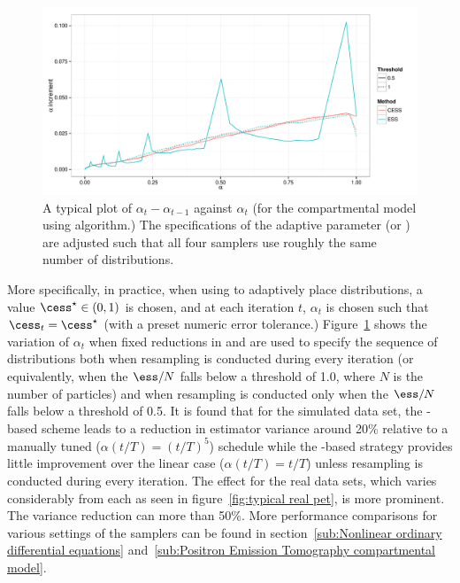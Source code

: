 \begin{figure}[t]
  \includegraphics[width=\linewidth]{fig/Adaptive_Dist}
  \caption{A typical plot of $\alpha_t - \alpha_{t-1}$ against $\alpha_t$ (for
    the \pet compartmental model using \smc[2] algorithm.) The specifications of
    the adaptive parameter (\ess or \cess) are adjusted such that all four
    samplers use roughly the same number of distributions.}
  \label{fig:adaptive_alpha}
\end{figure}

More specifically, in practice, when using \cess to adaptively place
distributions, a value $\cess^\star \in (0, 1)$ is chosen, and at each
iteration $t$, $\alpha_t$ is chosen such that $\cess_t = \cess^\star$ (with a
preset numeric error tolerance.) Figure~\ref{fig:adaptive_alpha} shows the
variation of $\alpha_t$ when fixed reductions in \ess and \cess are used to
specify the sequence of distributions both when resampling is conducted during
every iteration (or equivalently, when the $\ess/N$ falls below a threshold of
1.0, where $N$ is the number of particles) and when resampling is conducted
only when the $\ess/N$ falls below a threshold of 0.5. It is found that for
the simulated \pet data set, the \cess-based scheme leads to a reduction in
estimator variance around 20\% relative to a manually tuned ($\alpha(t/T) =
(t/T)^5$) schedule while the \ess-based strategy provides little improvement
over the linear case ($\alpha(t/T) = t/T$) unless resampling is conducted
during every iteration. The effect for the real data sets, which varies
considerably from each as seen in figure~\ref{fig:typical real pet}, is more
prominent. The variance reduction can more than 50\%. More performance
comparisons for various settings of the samplers can be found in
section~\ref{sub:Nonlinear ordinary differential equations}
and~\ref{sub:Positron Emission Tomography compartmental model}.

